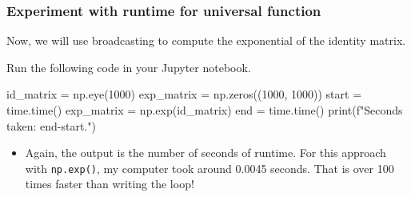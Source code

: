 \documentclass{beamer}
\newenvironment{codeblock}
    {\hfill\begin{beamerboxesrounded}[lower=codecol, width=0.8\textwidth]
    \medskip

    }
    { 
    \end{beamerboxesrounded}\hfill
    }
\theoremstyle{example}
\newcommand{\ttt}[1]{{\small\texttt{#1}}}
\begin{document}
\begin{frame}[fragile]
\frametitle{Experiment with runtime for universal function}
Now, we will use broadcasting to compute the exponential of the identity matrix.

\pause
Run the following code in your Jupyter notebook.

\begin{codeblock}

\begin{python}
id_matrix = np.eye(1000)
exp_matrix = np.zeros((1000, 1000))
start = time.time()
exp_matrix = np.exp(id_matrix)
end = time.time()
print(f"Seconds taken: {end-start}.")
\end{python}

\end{codeblock}

\vspace*{12pt}
\pause
\begin{itemize}
    \item[] Again, the output is the number of seconds of runtime. For this approach with \ttt{np.exp()}, my computer took around 0.0045 seconds. That is over 100 times faster than writing the loop!
\end{itemize}
\end{frame}
\end{document}

